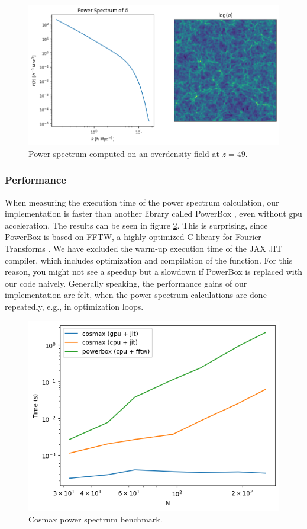 \documentclass{article}
\begin{document}
\begin{figure}
     \centering
     \includegraphics[width=0.75\linewidth]{img/power.png}
     \caption{Power spectrum computed on an overdensity field at $z=49$.}
     \label{fig:powerspectrum}
 \end{figure} 
 
\subsubsection{Performance}

When measuring the execution time of the power spectrum calculation, our implementation is faster than another library called {PowerBox} \citep{murray2018powerbox}, even without gpu acceleration. The results can be seen in figure \ref{fig:cosmax-bench}. This is surprising, since {PowerBox} is based on FFTW, a highly optimized C library for Fourier Transforms \citep{frigo1999fftw}. We have excluded the warm-up execution time of the {JAX} JIT compiler, which includes optimization and compilation of the function. For this reason, you might not see a speedup but a slowdown if {PowerBox} is replaced with our code naively. Generally speaking, the performance gains of our implementation are felt, when the power spectrum calculations are done repeatedly, e.g., in optimization loops.

\begin{figure}[h]
    \centering
    \includegraphics[width=0.5\linewidth]{img/benchmark.png}
    \caption{Cosmax power spectrum benchmark.}
    \label{fig:cosmax-bench}
\end{figure}
\end{document}
